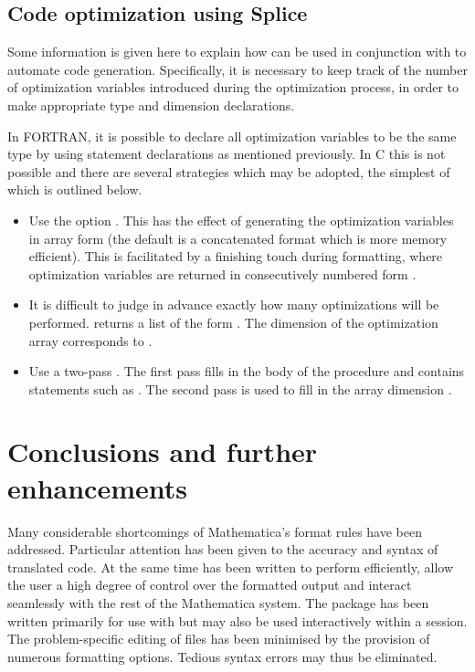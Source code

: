 \documentclass [12pt,twoside]{article}
\begin{document}
\pagebreak[2]

\subsection{Code optimization using Splice}
Some information is given here to explain how  can be used in
conjunction with  to automate code generation. Specifically, it is
necessary to keep track of the number of optimization variables introduced during
the optimization process, in order to make appropriate type and dimension
declarations.

In FORTRAN, it is possible to declare all optimization variables to be
the same type by using  statement declarations as mentioned
previously. In C this is not possible and there are several strategies which may
be adopted, the simplest of which is outlined below.
\begin{itemize}
\item Use the option . This has the effect of generating the
optimization variables in array form  (the default is a concatenated format
 which is more memory efficient). This is facilitated by a finishing touch during
formatting, where optimization variables are returned in consecutively numbered form
.

\item It is difficult to judge in advance exactly how many optimizations will be
performed.  returns a list of the form .
The dimension of the optimization array corresponds to .

\item Use a two-pass . The first pass fills in the body of the procedure
and contains statements such as . The second pass
is used to fill in the array dimension .
\end{itemize}

\pagebreak[2]
 
\section{Conclusions and further enhancements}

Many considerable shortcomings of Mathematica's format rules have been
addressed. Particular attention has been given to the accuracy and syntax of
translated code. At the same time  has been written to perform
efficiently, allow the user a high degree of control over the formatted output
and interact seamlessly with the rest of the Mathematica system. The package has
been written primarily for use with  but may also be used
interactively within a session. The problem-specific editing of files has been
minimised by the provision of numerous formatting options. Tedious syntax errors
may thus be eliminated.
\end{document}
